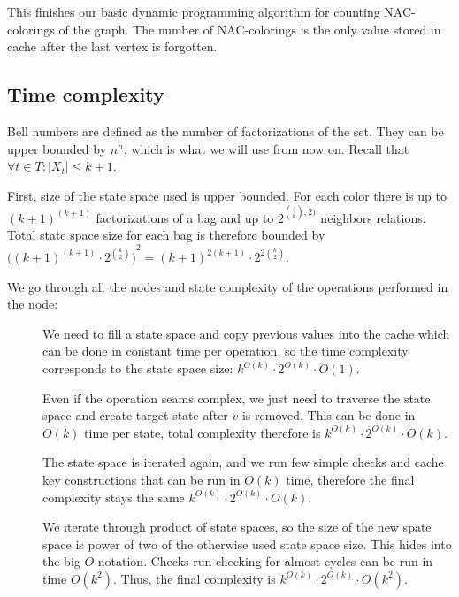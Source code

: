 This finishes our basic dynamic programming algorithm
for counting NAC-colorings of the graph.
The number of NAC-colorings is the only value stored in cache
after the last vertex is forgotten.



\subsection{Time complexity}

Bell numbers are defined as the number of factorizations of the set.
They can be upper bounded by \( n^n \), which is what we will use from now on.
Recall that \( \forall t \in T : |X_t| \le k+1 \).

First, size of the state space used is upper bounded.
For each color there is up to \( {(k+1)}^{(k+1)} \) factorizations of a bag and
up to \( 2^{\binom(k, 2)} \) neighbors relations.
Total state space size for each bag is therefore bounded by
\( {\big({(k+1)}^{(k+1)} \cdot 2^{\binom{k}{2}} \big)}^2 = {(k+1)}^{2(k+1)} \cdot 2^{2 \binom{k}{2}} \).

We go through all the nodes and state complexity of the operations performed in the node:
\begin{description}
	\item[\IntroduceVertexNode{}]
	      We need to fill a state space and copy previous values into the cache
	      which can be done in constant time per operation,
	      so the time complexity corresponds to the state space size:
	      \( {k}^{O(k)} \cdot 2^{O(k)} \cdot O(1) \).
	\item[\ForgetVertexNode{}]
	      Even if the operation seams complex, we just need to traverse the state space
	      and create target state after \( v \) is removed. This can be done in \( O(k) \) time
	      per state, total complexity therefore is
	      \( {k}^{O(k)} \cdot 2^{O(k)} \cdot O(k) \).
	\item[\IntroduceEdgeNode{}]
	      The state space is iterated again, and we run few simple checks and cache key constructions
	      that can be run in \( O(k) \) time, therefore the final complexity stays the same
	      \( {k}^{O(k)} \cdot 2^{O(k)} \cdot O(k) \).
	\item[\JoinNode{}]
	      We iterate through product of state spaces,
	      so the size of the new spate space is power of two
	      of the otherwise used state space size.
	      This hides into the big \( O \) notation.
	      Checks run checking for almost cycles can be run in time \( O(k^2) \).
	      Thus, the final		complexity is
	      \( {k}^{O(k)} \cdot 2^{O(k)} \cdot O(k^2) \).
\end{description}

